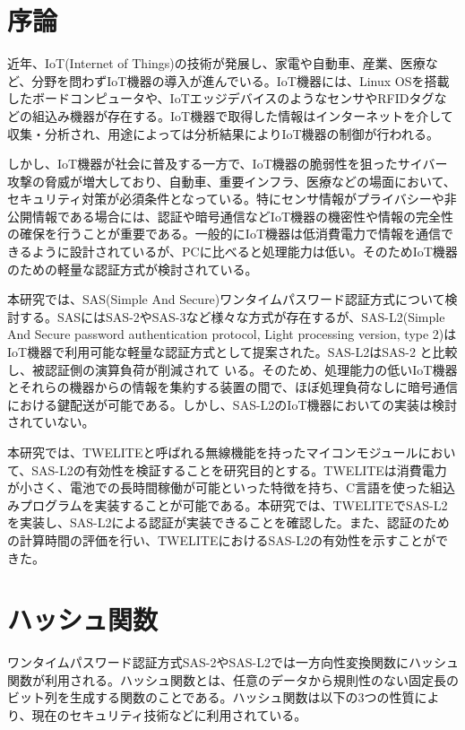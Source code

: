\documentclass{thesis}
\begin{document}
\tableofcontents

\chapter{序論}
\quad 近年、IoT(Internet of Things)の技術が発展し、家電や自動車、産業、医療など、分野を問わずIoT機器の導入が進んでいる。IoT機器には、Linux OSを搭載したボードコンピュータや、IoTエッジデバイスのようなセンサやRFIDタグなどの組込み機器が存在する。IoT機器で取得した情報はインターネットを介して収集・分析され、用途によっては分析結果によりIoT機器の制御が行われる。

しかし、IoT機器が社会に普及する一方で、IoT機器の脆弱性を狙ったサイバー攻撃の脅威が増大しており、自動車、重要インフラ、医療などの場面において、セキュリティ対策が必須条件となっている。特にセンサ情報がプライバシーや非公開情報である場合には、認証や暗号通信などIoT機器の機密性や情報の完全性の確保を行うことが重要である。一般的にIoT機器は低消費電力で情報を通信できるように設計されているが、PCに比べると処理能力は低い。そのためIoT機器のための軽量な認証方式が検討されている。

本研究では、SAS(Simple And Secure)ワンタイムパスワード認証方式について検討する。SASにはSAS-2やSAS-3など様々な方式が存在するが、SAS-L2(Simple And Secure password authentication protocol, Light processing version, type 2)はIoT機器で利用可能な軽量な認証方式として提案された。SAS-L2はSAS-2 と比較し、被認証側の演算負荷が削減されて
いる。そのため、処理能力の低いIoT機器とそれらの機器からの情報を集約する装置の間で、ほぼ処理負荷なしに暗号通信における鍵配送が可能である。しかし、SAS-L2のIoT機器においての実装は検討されていない。

本研究では、TWELITEと呼ばれる無線機能を持ったマイコンモジュールにおいて、SAS-L2の有効性を検証することを研究目的とする。TWELITEは消費電力が小さく、電池での長時間稼働が可能といった特徴を持ち、C言語を使った組込みプログラムを実装することが可能である。本研究では、TWELITEでSAS-L2を実装し、SAS-L2による認証が実装できることを確認した。また、認証のための計算時間の評価を行い、TWELITEにおけるSAS-L2の有効性を示すことができた。

\chapter{ハッシュ関数}
\quad ワンタイムパスワード認証方式SAS-2やSAS-L2では一方向性変換関数にハッシュ関数が利用される。ハッシュ関数とは、任意のデータから規則性のない固定長のビット列を生成する関数のことである。ハッシュ関数は以下の3つの性質により、現在のセキュリティ技術などに利用されている\cite{one}。
\end{document}
